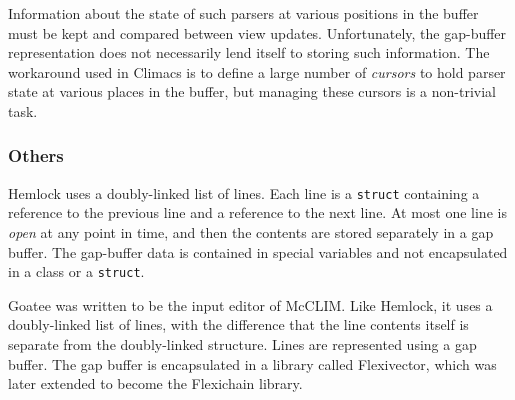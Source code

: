 Information about the state of such parsers at various positions in
the buffer must be kept and compared between view updates.
Unfortunately, the gap-buffer representation does not necessarily lend
itself to storing such information.  The workaround used in Climacs is
to define a large number of \emph{cursors} to hold parser state at
various places in the buffer, but managing these cursors is a
non-trivial task.

\subsubsection{Others}

Hemlock uses a doubly-linked list of lines.  Each line is a
\texttt{struct} containing a reference to the previous line and a
reference to the next line.  At most one line is \emph{open} at any
point in time, and then the contents are stored separately in a gap
buffer.  The gap-buffer data is contained in special variables and not
encapsulated in a class or a \texttt{struct}.

Goatee was written to be the input editor of McCLIM.  Like Hemlock, it
uses a doubly-linked list of lines, with the difference that the line
contents itself is separate from the doubly-linked structure.  Lines
are represented using a gap buffer.  The gap buffer is encapsulated in
a library called Flexivector, which was later extended to become the
Flexichain library.
